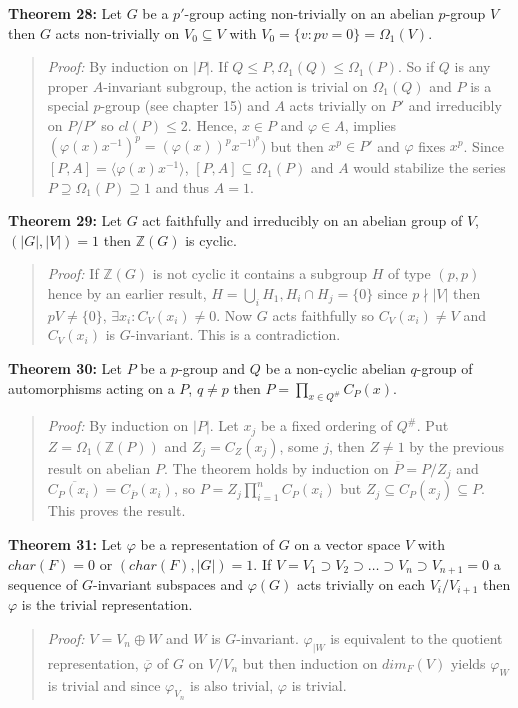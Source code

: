{\bf Theorem 28:}
Let $G$ be a $p'$-group acting non-trivially on an abelian $p$-group $V$ then $G$ acts
non-trivially on $V_0 \subseteq V$ with $V_0 = \{ v: pv= 0 \} = \Omega_1(V)$.
\begin{quote}
\emph{Proof:}  
By induction on $|P|$.  If $Q \le P, \Omega_1(Q) \le \Omega_1(P)$.  So if
$Q$ is any proper $A$-invariant subgroup, the action is trivial on $\Omega_1(Q)$
and $P$ is a special $p$-group (see chapter 15) and $A$ acts trivially on $P'$ and
irreducibly on $P/P'$ so $cl(P) \le 2$.  Hence,
$x \in P$ and $\varphi \in  A$, implies $ (\varphi(x)x^{-1})^p = (\varphi(x))^px^{-1)^p}) $
but then $x^p \in P'$ and $\varphi$ fixes $x^p$.  Since $[P,A] = \langle \varphi(x) x^{-1} \rangle$,
$[P, A] \subseteq \Omega_1(P)$ and $A$ would stabilize the series
$P \supseteq \Omega_1(P) \supseteq 1$ and thus $A=1$.
\end{quote}
{\bf Theorem 29:}
Let $G$ act faithfully and irreducibly on an abelian group of $V$, $(|G|, |V|)= 1$ then
${\mathbb Z}(G)$ is cyclic.
\begin{quote}
\emph{Proof:}  
If ${\mathbb Z}(G)$ is not cyclic it contains a subgroup $H$ of type $(p, p)$ hence
by an earlier result, $H= \bigcup_{i} H_1, H_i \cap H_j = \{ 0 \}$ since 
$p \nmid |V|$ then $pV \ne \{ 0 \}$, $\exists x_i: C_V(x_i ) \ne 0$.  Now $G$
acts faithfully so $C_V(x_i) \ne V$ and $C_V(x_i)$ is $G$-invariant.  This is a contradiction.
\end{quote}
{\bf Theorem 30:}
Let $P$ be a $p$-group and $Q$ be a non-cyclic abelian $q$-group of automorphisms acting on a $P$,
$q \ne p$
then $P= \prod_{x \in Q^{\#}} C_P(x)$.
\begin{quote}
\emph{Proof:}  
By induction on $|P|$.
Let $x_j$ be a fixed ordering of $Q^{\#}$.
Put $Z= \Omega_1({\mathbb Z}(P))$ 
and $Z_j= C_Z(x_j)$, some $j$,
then $Z \ne 1$ by the previous result on abelian $P$.
The theorem holds by induction on ${\overline P}= P/Z_j$ and
${\overline {C_P(x_i)}}= C_{\overline P}(x_i)$, 
so $P= Z_j \prod_{i=1}^n C_P(x_i)$ but
$Z_j \subseteq C_P(x_j) \subseteq P$.  This proves the result.
\end{quote}
{\bf Theorem 31:}
Let $\varphi$ be a representation of $G$ on a vector space $V$ with $char(F)=0$ or
$(char(F), |G|) = 1$. If 
$ V= V_1 \supset V_2 \supset \ldots \supset V_n \supset V_{n+1}= 0$ a sequence of $G$-invariant
subspaces and $\varphi(G)$ acts trivially on each $V_i/V_{i+1}$ then $\varphi$ is the trivial
representation.
\begin{quote}
\emph{Proof:}  
$V= V_n \oplus W$ and $W$ is $G$-invariant.  $\varphi_{|W}$ is equivalent to the
quotient representation, ${\overline {\varphi}}$ of $G$ on $V/V_n$ but then
induction on $dim_F(V)$ yields $\varphi_{W}$ is trivial and since $\varphi_{V_n}$ is also
trivial, $\varphi$ is trivial.
\end{quote}
